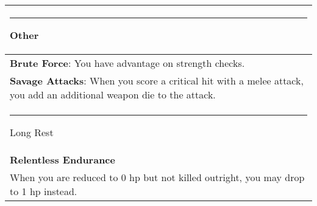 \documentclass[twocolumn]{article}
\begin{document}
\\
\noindent\begin{tabular}{|m{3.1in}|}
\hline
\rule{1.3in}{0pt}Other\\
\hline
\textbf{Brute Force}: You have advantage on strength checks. \\
\hline
\textbf{Savage Attacks}: When you score a critical hit with a melee attack, you add an additional weapon die to the attack. \\
\hline
\rule{1.22in}{0pt}Long Rest\\
\hline
\textbf{Relentless Endurance}\\
When you are reduced to 0 hp but not killed outright, you may drop to 1 hp instead. \\
\hline
\end{tabular}
\end{document}
